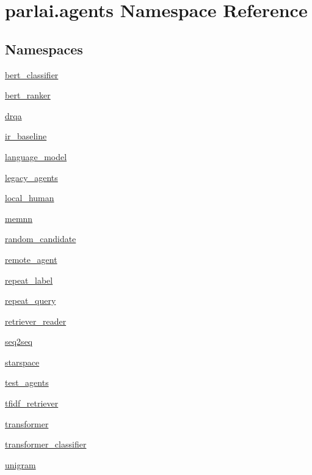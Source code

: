 \hypertarget{namespaceparlai_1_1agents}{}\section{parlai.\+agents Namespace Reference}
\label{namespaceparlai_1_1agents}
\subsection*{Namespaces}
\begin{DoxyCompactItemize}
\item 
 \hyperlink{namespaceparlai_1_1agents_1_1bert__classifier}{bert\+\_\+classifier}
\item 
 \hyperlink{namespaceparlai_1_1agents_1_1bert__ranker}{bert\+\_\+ranker}
\item 
 \hyperlink{namespaceparlai_1_1agents_1_1drqa}{drqa}
\item 
 \hyperlink{namespaceparlai_1_1agents_1_1ir__baseline}{ir\+\_\+baseline}
\item 
 \hyperlink{namespaceparlai_1_1agents_1_1language__model}{language\+\_\+model}
\item 
 \hyperlink{namespaceparlai_1_1agents_1_1legacy__agents}{legacy\+\_\+agents}
\item 
 \hyperlink{namespaceparlai_1_1agents_1_1local__human}{local\+\_\+human}
\item 
 \hyperlink{namespaceparlai_1_1agents_1_1memnn}{memnn}
\item 
 \hyperlink{namespaceparlai_1_1agents_1_1random__candidate}{random\+\_\+candidate}
\item 
 \hyperlink{namespaceparlai_1_1agents_1_1remote__agent}{remote\+\_\+agent}
\item 
 \hyperlink{namespaceparlai_1_1agents_1_1repeat__label}{repeat\+\_\+label}
\item 
 \hyperlink{namespaceparlai_1_1agents_1_1repeat__query}{repeat\+\_\+query}
\item 
 \hyperlink{namespaceparlai_1_1agents_1_1retriever__reader}{retriever\+\_\+reader}
\item 
 \hyperlink{namespaceparlai_1_1agents_1_1seq2seq}{seq2seq}
\item 
 \hyperlink{namespaceparlai_1_1agents_1_1starspace}{starspace}
\item 
 \hyperlink{namespaceparlai_1_1agents_1_1test__agents}{test\+\_\+agents}
\item 
 \hyperlink{namespaceparlai_1_1agents_1_1tfidf__retriever}{tfidf\+\_\+retriever}
\item 
 \hyperlink{namespaceparlai_1_1agents_1_1transformer}{transformer}
\item 
 \hyperlink{namespaceparlai_1_1agents_1_1transformer__classifier}{transformer\+\_\+classifier}
\item 
 \hyperlink{namespaceparlai_1_1agents_1_1unigram}{unigram}
\end{DoxyCompactItemize}
